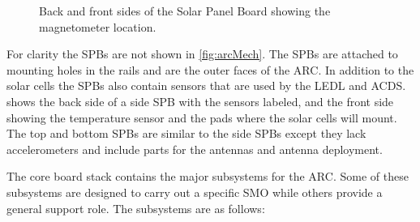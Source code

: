 \begin{figure}[!ht]
    
    \caption{Back and front sides of the Solar Panel Board showing the magnetometer location.}
    \label{fig:SPB}
\end{figure}

For clarity the \acp{SPB} are not shown in \cref{fig:arcMech}. The \acp{SPB} are attached to mounting holes in the rails and are the outer faces of the \ac{ARC}. In addition to the solar cells the \acp{SPB} also contain sensors that are used by the \ac{LEDL} and \ac{ACDS}.  shows the back side of a side \ac{SPB} with the sensors labeled, and the front side showing the temperature sensor and the pads where the solar cells will mount. The top and bottom \acp{SPB} are similar to the side \acp{SPB} except they lack accelerometers and include parts for the antennas and antenna deployment.

The core board stack contains the major subsystems for the \ac{ARC}. Some of these subsystems are designed to carry out a specific \ac{SMO} while others provide a general support role. The subsystems are as follows:

